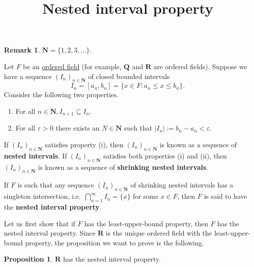 \documentclass[12pt]{article}
\title{Nested interval property}
\author{}
\date{\vspace{-24mm}}
\theoremstyle{definition}
\newtheorem{proposition}[definition]{Proposition}
\newtheorem*{remark}{Remark}
\newcommand{\N}{\mathbf{N}}
\newcommand{\Q}{\mathbf{Q}}
\newcommand{\R}{\mathbf{R}}
\begin{document}
\begin{remark}
    \( \N = \{ 1, 2, 3, \ldots \} \).
\end{remark}

\noindent Let \( F \) be an \href{https://en.wikipedia.org/wiki/Ordered_field}{ordered field} (for example, \( \Q \) and \( \R \) are ordered fields). Suppose we have a sequence \( (I_n)_{n \in \N} \) of closed bounded intervals
\[
    I_n = [a_n, b_n] = \{ x \in F : a_n \leq x \leq b_n \}.
\]
Consider the following two properties.
\begin{enumerate}[label = (\roman*)]
    \item For all \( n \in \N, I_{n+1} \subseteq I_n \).

    \item For all \( \varepsilon > 0 \) there exists an \( N \in \N \) such that \( |I_n| := b_n - a_n < \varepsilon \).
\end{enumerate}

If \( (I_n)_{n \in \N} \) satisfies property (i), then \( (I_n)_{n \in \N} \) is known as a sequence of \textbf{nested intervals}. If \( (I_n)_{n \in \N} \) satisfies both properties (i) and (ii), then \( (I_n)_{n \in \N} \) is known as a sequence of \textbf{shrinking nested intervals}.

If \( F \) is such that any sequence \( (I_n)_{n \in \N} \) of shrinking nested intervals has a singleton intersection, i.e.\ \( \bigcap_{n=1}^{\infty} I_n = \{ x \} \) for some \( x \in F \), then \( F \) is said to have the \textbf{nested interval property}.

Let us first show that if \( F \) has the least-upper-bound property, then \( F \) has the nested interval property. Since \( \R \) is the unique ordered field with the least-upper-bound property, the proposition we want to prove is the following.

\begin{proposition}
\label{prop:R_has_nip}
    \( \R \) has the nested interval property.
\end{proposition}
\end{document}
